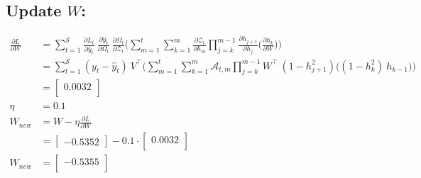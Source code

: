 \documentclass{article}
\begin{document}
\subsection{Update $W$:}
\begin{align*}
    \frac{\partial L}{ \partial{W}} &= 
\sum_{t=1}^{\mathcal{S}}
\frac{\partial L_t}{\partial \hat{y}_t}~\frac{\partial \hat{y}_t}{\partial \Omega_t}~\frac{\partial \Omega_t}{ \partial \mathcal{Z}_t} \biggl( 
\sum_{m=1}^{t}
\sum_{k=1}^{m} \frac{\partial \mathcal{Z}_t}{ \partial h_m} 
\prod_{j=k}^{m-1} \frac{\partial h_{j+1}}{ \partial h_j} 
\biggl( \frac{\partial h_k}{ \partial W} \biggl) \biggl) \\
  &=
\sum_{t=1}^{\mathcal{S}}
(y_t - \hat{y}_t)~V^\top \biggl( 
\sum_{m=1}^{t}
\sum_{k=1}^{m} \mathcal{A}_{t,m} 
\prod_{j=k}^{m-1} W^\top ~ (1 - h_{j+1}^2)
\biggl( (1-h_k^2)~ h_{k-1} \biggl) \biggl) \\
 &= \begin{bmatrix}
0.0032 \\
\end{bmatrix}\\
\eta &= 0.1\\
W_{new} &= W - \eta \frac{\partial L}{\partial W}\\
&= \begin{bmatrix}
    -0.5352
\end{bmatrix}- 0.1 \cdot \begin{bmatrix}
0.0032 \\
\end{bmatrix}\\
W_{new} &= \begin{bmatrix}
-0.5355 \\
\end{bmatrix}
\end{align*}
\end{document}
